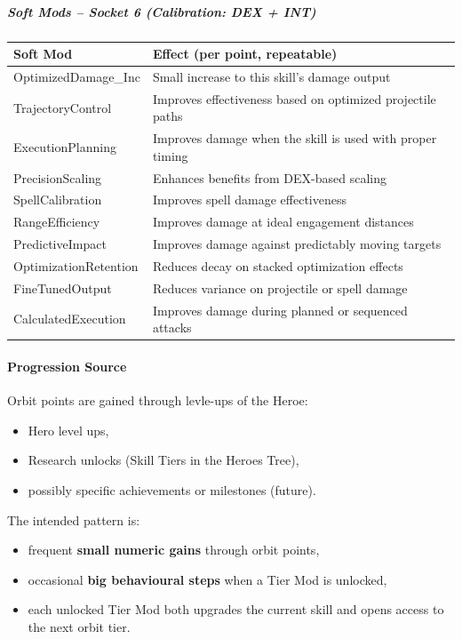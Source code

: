 \subparagraph{Soft Mods -- Socket 6 (Calibration: DEX + INT)}
\begin{tabular}{l|p{9.5cm}}
	\textbf{Soft Mod} & \textbf{Effect (per point, repeatable)} \\ \hline
	OptimizedDamage\_Inc & Small increase to this skill’s damage output \\
	TrajectoryControl & Improves effectiveness based on optimized projectile paths \\
	ExecutionPlanning & Improves damage when the skill is used with proper timing \\
	PrecisionScaling & Enhances benefits from DEX-based scaling \\
	SpellCalibration & Improves spell damage effectiveness \\
	RangeEfficiency & Improves damage at ideal engagement distances \\
	PredictiveImpact & Improves damage against predictably moving targets \\
	OptimizationRetention & Reduces decay on stacked optimization effects \\
	FineTunedOutput & Reduces variance on projectile or spell damage \\
	CalculatedExecution & Improves damage during planned or sequenced attacks \\
\end{tabular}

\paragraph{Progression Source}

Orbit points are gained through levle-ups of the Heroe:

\begin{itemize}
	\item Hero level ups,
	\item Research unlocks (Skill Tiers in the Heroes Tree),
	\item possibly specific achievements or milestones (future).
\end{itemize}

The intended pattern is:

\begin{itemize}
	\item frequent \textbf{small numeric gains} through orbit points,
	\item occasional \textbf{big behavioural steps} when a Tier Mod is unlocked,
	\item each unlocked Tier Mod both upgrades the current skill and opens access to the next orbit tier.
\end{itemize}

